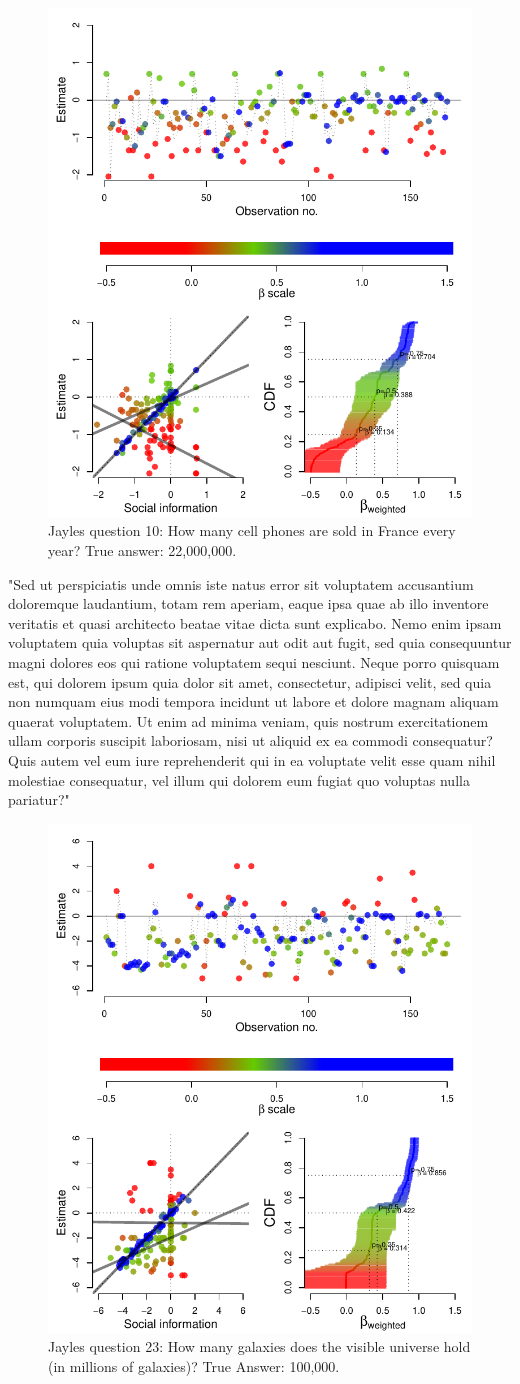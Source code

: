 \documentclass[10pt,a4paper,twocolumn,lineno]{article}
\begin{document}
\begin{figure}[htbp]
	\centering\includegraphics[width=.5\textwidth]{../plots/jayles10.pdf}
	\caption{Jayles question 10: How many cell phones are sold in France every year? True answer: 22,000,000.}\label{fig: Jayles question 10}
\end{figure}

"Sed ut perspiciatis unde omnis iste natus error sit voluptatem accusantium doloremque laudantium, totam rem aperiam, eaque ipsa quae ab illo inventore veritatis et quasi architecto beatae vitae dicta sunt explicabo. Nemo enim ipsam voluptatem quia voluptas sit aspernatur aut odit aut fugit, sed quia consequuntur magni dolores eos qui ratione voluptatem sequi nesciunt. Neque porro quisquam est, qui dolorem ipsum quia dolor sit amet, consectetur, adipisci velit, sed quia non numquam eius modi tempora incidunt ut labore et dolore magnam aliquam quaerat voluptatem. Ut enim ad minima veniam, quis nostrum exercitationem ullam corporis suscipit laboriosam, nisi ut aliquid ex ea commodi consequatur? Quis autem vel eum iure reprehenderit qui in ea voluptate velit esse quam nihil molestiae consequatur, vel illum qui dolorem eum fugiat quo voluptas nulla pariatur?"

\begin{figure}[htbp]
	\centering\includegraphics[width=.5\textwidth]{../plots/jayles23.pdf}
	\caption{Jayles question 23: How many galaxies does the visible universe hold (in millions of galaxies)? True Answer: 100,000.}\label{fig: Jayles question 23}
\end{figure}
\end{document}
